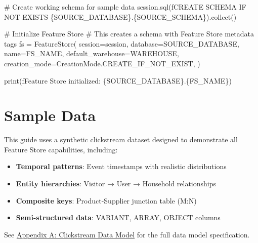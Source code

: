 \documentclass[
  letterpaper,
  DIV=11,
  numbers=noendperiod]{scrreprt}
\newenvironment{Shaded}{\begin{snugshade}}{\end{snugshade}}
\newcommand{\BuiltInTok}[1]{\textcolor[rgb]{0.00,0.23,0.31}{#1}}
\newcommand{\CommentTok}[1]{\textcolor[rgb]{0.37,0.37,0.37}{#1}}
\newcommand{\NormalTok}[1]{\textcolor[rgb]{0.00,0.23,0.31}{#1}}
\newcommand{\OperatorTok}[1]{\textcolor[rgb]{0.37,0.37,0.37}{#1}}
\newcommand{\SpecialCharTok}[1]{\textcolor[rgb]{0.37,0.37,0.37}{#1}}
\newcommand{\SpecialStringTok}[1]{\textcolor[rgb]{0.13,0.47,0.30}{#1}}
\providecommand{\tightlist}{%
  \setlength{\itemsep}{0pt}\setlength{\parskip}{0pt}}\usepackage{longtable,booktabs,array}
\begin{document}
\begin{Shaded}
\begin{Highlighting}[]
\CommentTok{\# Create working schema for sample data}
\NormalTok{session.sql(}\SpecialStringTok{f\textquotesingle{}CREATE SCHEMA IF NOT EXISTS }\SpecialCharTok{\{}\NormalTok{SOURCE\_DATABASE}\SpecialCharTok{\}}\SpecialStringTok{.}\SpecialCharTok{\{}\NormalTok{SOURCE\_SCHEMA}\SpecialCharTok{\}}\SpecialStringTok{\textquotesingle{}}\NormalTok{).collect()}

\CommentTok{\# Initialize Feature Store}
\CommentTok{\# This creates a schema with Feature Store metadata tags}
\NormalTok{fs }\OperatorTok{=}\NormalTok{ FeatureStore(}
\NormalTok{    session}\OperatorTok{=}\NormalTok{session,}
\NormalTok{    database}\OperatorTok{=}\NormalTok{SOURCE\_DATABASE,}
\NormalTok{    name}\OperatorTok{=}\NormalTok{FS\_NAME,}
\NormalTok{    default\_warehouse}\OperatorTok{=}\NormalTok{WAREHOUSE,}
\NormalTok{    creation\_mode}\OperatorTok{=}\NormalTok{CreationMode.CREATE\_IF\_NOT\_EXIST,}
\NormalTok{)}

\BuiltInTok{print}\NormalTok{(}\SpecialStringTok{f\textquotesingle{}Feature Store initialized: }\SpecialCharTok{\{}\NormalTok{SOURCE\_DATABASE}\SpecialCharTok{\}}\SpecialStringTok{.}\SpecialCharTok{\{}\NormalTok{FS\_NAME}\SpecialCharTok{\}}\SpecialStringTok{\textquotesingle{}}\NormalTok{)}
\end{Highlighting}
\end{Shaded}

\hypertarget{sample-data}{%
\section{Sample Data}\label{sample-data}}

This guide uses a synthetic clickstream dataset designed to demonstrate
all Feature Store capabilities, including:

\begin{itemize}
\tightlist
\item
  \textbf{Temporal patterns}: Event timestamps with realistic
  distributions
\item
  \textbf{Entity hierarchies}: Visitor → User → Household relationships
\item
  \textbf{Composite keys}: Product-Supplier junction table (M:N)
\item
  \textbf{Semi-structured data}: VARIANT, ARRAY, OBJECT columns
\end{itemize}

See \protect\hyperlink{sample-data-1}{Appendix A: Clickstream Data
Model} for the full data model specification.
\end{document}
